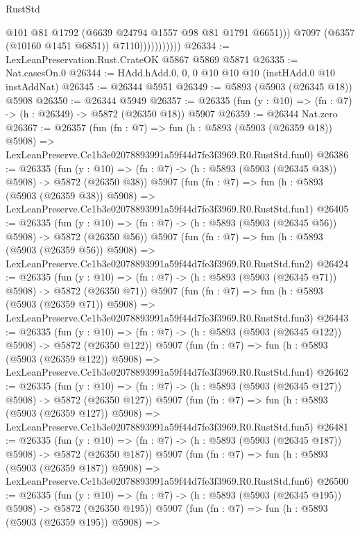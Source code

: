 \begin{lexlean}{RustStd}
\begin{coremodule}
                              @101
                              @81
                              @1792
                              (@6639 @24794 @1557 @98 @81 @1791 @6651)))
                          @7097
                          (@6357 (@10160 @1451 @6851))
                          @7110)))))))))))
@26334 := LexLeanPreservation.Rust.CrateOK @5867 @5869 @5871
@26335 := Nat.casesOn.{0}
@26344 := HAdd.hAdd.{0, 0, 0} @10 @10 @10 (instHAdd.{0} @10 instAddNat)
@26345 := @26344 @5951
@26349 := @5893 (@5903 (@26345 @18)) @5908
@26350 := @26344 @5949
@26357 := @26335 (fun (y : @10) => (fn : @7) -> (h : @26349) -> @5872 (@26350 @18)) @5907
@26359 := @26344 Nat.zero
@26367 := @26357
    (fun (fn : @7) =>
    fun (h : @5893 (@5903 (@26359 @18)) @5908) =>
    LexLeanPreserve.Cc1b3e02078893991a59f44d7fe3f3969.R0.RustStd.fun0)
@26386 := @26335
    (fun (y : @10) => (fn : @7) -> (h : @5893 (@5903 (@26345 @38)) @5908) -> @5872 (@26350 @38))
    @5907
    (fun (fn : @7) =>
    fun (h : @5893 (@5903 (@26359 @38)) @5908) =>
    LexLeanPreserve.Cc1b3e02078893991a59f44d7fe3f3969.R0.RustStd.fun1)
@26405 := @26335
    (fun (y : @10) => (fn : @7) -> (h : @5893 (@5903 (@26345 @56)) @5908) -> @5872 (@26350 @56))
    @5907
    (fun (fn : @7) =>
    fun (h : @5893 (@5903 (@26359 @56)) @5908) =>
    LexLeanPreserve.Cc1b3e02078893991a59f44d7fe3f3969.R0.RustStd.fun2)
@26424 := @26335
    (fun (y : @10) => (fn : @7) -> (h : @5893 (@5903 (@26345 @71)) @5908) -> @5872 (@26350 @71))
    @5907
    (fun (fn : @7) =>
    fun (h : @5893 (@5903 (@26359 @71)) @5908) =>
    LexLeanPreserve.Cc1b3e02078893991a59f44d7fe3f3969.R0.RustStd.fun3)
@26443 := @26335
    (fun (y : @10) => (fn : @7) -> (h : @5893 (@5903 (@26345 @122)) @5908) -> @5872 (@26350 @122))
    @5907
    (fun (fn : @7) =>
    fun (h : @5893 (@5903 (@26359 @122)) @5908) =>
    LexLeanPreserve.Cc1b3e02078893991a59f44d7fe3f3969.R0.RustStd.fun4)
@26462 := @26335
    (fun (y : @10) => (fn : @7) -> (h : @5893 (@5903 (@26345 @127)) @5908) -> @5872 (@26350 @127))
    @5907
    (fun (fn : @7) =>
    fun (h : @5893 (@5903 (@26359 @127)) @5908) =>
    LexLeanPreserve.Cc1b3e02078893991a59f44d7fe3f3969.R0.RustStd.fun5)
@26481 := @26335
    (fun (y : @10) => (fn : @7) -> (h : @5893 (@5903 (@26345 @187)) @5908) -> @5872 (@26350 @187))
    @5907
    (fun (fn : @7) =>
    fun (h : @5893 (@5903 (@26359 @187)) @5908) =>
    LexLeanPreserve.Cc1b3e02078893991a59f44d7fe3f3969.R0.RustStd.fun6)
@26500 := @26335
    (fun (y : @10) => (fn : @7) -> (h : @5893 (@5903 (@26345 @195)) @5908) -> @5872 (@26350 @195))
    @5907
    (fun (fn : @7) =>
    fun (h : @5893 (@5903 (@26359 @195)) @5908) =>

\end{coremodule}
\end{lexlean}
